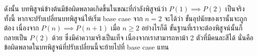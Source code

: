 \begin{theorem}[not!]
ดังนั้น บทพิสูจน์ข้างต้นมีข้อผิดพลาดเกิดขึ้นในขณะที่กำลังพิสูจน์ว่า $P(1)\implies P(2)$ เป็นจริง \enskip ทั้งนี้ หากจะปรับเปลี่ยนบทพิสูจน์ให้เริ่ม base case จาก $n=2$ จะได้ว่า ขั้นอุปนัยของเรานั้นจะถูกต้อง เนื่องจาก $P(n)\implies P(n+1)$ เมื่อ $n\geq 2$ อย่างไรก็ดี ขั้นฐานที่เราจะต้องพิสูจน์นั้นก็กลายเป็น $P(2)$ ด้วย ซึ่งมีค่าความจริงเป็นเท็จ เนื่องจากเราสามารถหาม้า 2 ตัวที่มีคนละสีได้ นั่นคือ ข้อผิดพลาดในบทพิสูจน์ที่ปรับเปลี่ยนนี้จะย้ายไปที่ base case แทน
\end{theorem}
